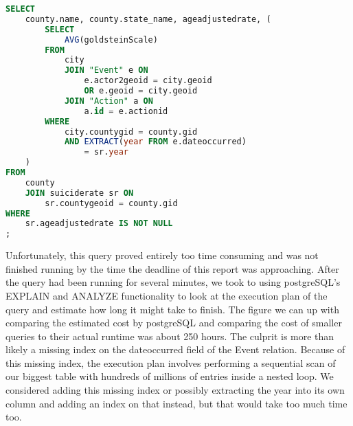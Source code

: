\begin{lstlisting}[language=SQL]
SELECT
    county.name, county.state_name, ageadjustedrate, (
        SELECT
            AVG(goldsteinScale)
        FROM
            city
            JOIN "Event" e ON 
                e.actor2geoid = city.geoid 
                OR e.geoid = city.geoid
            JOIN "Action" a ON 
                a.id = e.actionid
        WHERE
            city.countygid = county.gid 
            AND EXTRACT(year FROM e.dateoccurred) 
                = sr.year
    )
FROM
    county
    JOIN suiciderate sr ON 
        sr.countygeoid = county.gid
WHERE
    sr.ageadjustedrate IS NOT NULL
;
\end{lstlisting}

Unfortunately, this query proved entirely too time consuming and was not finished running by the time the deadline of this report was approaching.
After the query had been running for several minutes, we took to using postgreSQL's EXPLAIN and ANALYZE functionality to look at the execution plan of the query and estimate how long it might take to finish.
The figure we can up with comparing the estimated cost by postgreSQL and comparing the cost of smaller queries to their actual runtime was about 250 hours.
The culprit is more than likely a missing index on the dateoccurred field of the Event relation.
Because of this missing index, the execution plan involves performing a sequential scan of our biggest table with hundreds of millions of entries inside a nested loop.
We considered adding this missing index or possibly extracting the year into its own column and adding an index on that instead, but that would take too much time too.